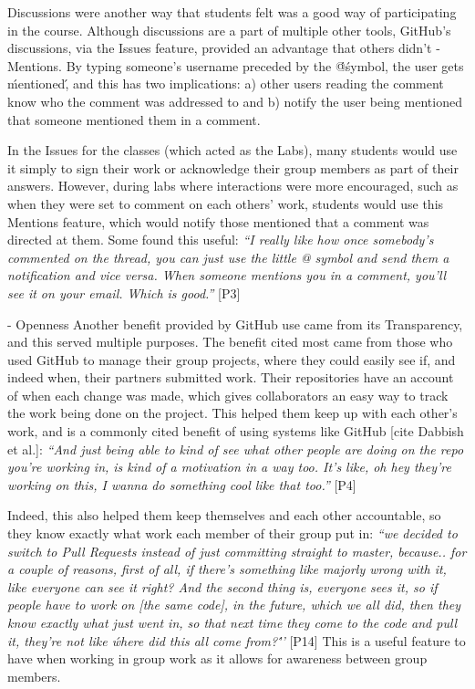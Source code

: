 Discussions were another way that students felt was a good way of participating in the course. Although discussions are a part of multiple other tools, GitHub's discussions, via the Issues feature, provided an advantage that others didn't - Mentions. By typing someone's username preceded by the \'@\' symbol, the user gets \'mentioned\', and this has two implications: a) other users reading the comment know who the comment was addressed to and b) notify the user being mentioned that someone mentioned them in a comment.

In the Issues for the classes (which acted as the Labs), many students would use it simply to sign their work or acknowledge their group members as part of their answers. However, during labs where interactions were more encouraged, such as when they were set to comment on each others' work, students would use this Mentions feature, which would notify those mentioned that a comment was directed at them. Some found this useful: \textit{``I really like how once somebody's commented on the thread, you can just use the little @ symbol and send them a notification and vice versa. When someone mentions you in a comment, you'll see it on your email. Which is good.''} [P3]

- Openness
Another benefit provided by GitHub use came from its Transparency, and this served multiple purposes. The benefit cited most came from those who used GitHub to manage their group projects, where they could easily see if, and indeed when, their partners submitted work. Their repositories have an account of when each change was made, which gives collaborators an easy way to track the work being done on the project. This helped them keep up with each other's work, and is a commonly cited benefit of using systems like GitHub [cite Dabbish et al.]: \textit{``And just being able to kind of see what other people are doing on the repo you're working in, is kind of a motivation in a way too. It's like, oh hey they're working on this, I wanna do something cool like that too.''} [P4]

Indeed, this also helped them keep themselves and each other accountable, so they know exactly what work each member of their group put in: \textit{``we decided to switch to Pull Requests instead of just committing straight to master, because.. for a couple of reasons, first of all, if there's something like majorly wrong with it, like everyone can see it right? And the second thing is, everyone sees it, so if people have to work on [the same code], in the future, which we all did, then they know exactly what just went in, so that next time they come to the code and pull it, they're not like \'where did this all come from?\'''} [P14] This is a useful feature to have when working in group work as it allows for awareness between group members.

